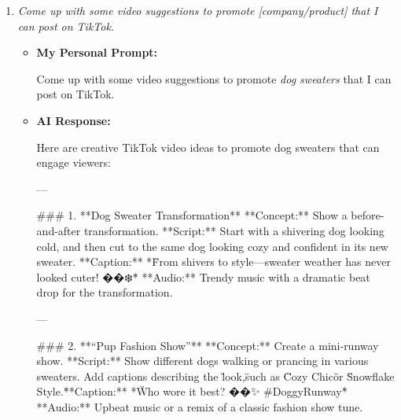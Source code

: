 \documentclass[12pt]{article}
\begin{document}
\begin{enumerate}
\begin{itemize}
---

### 9. **Holiday Cheer**
   **Caption:**  
   *"Santa’s little helper never looked so adorable! ���� Dress your pup in holiday spirit with our festive collection."*  
   **Visual:**  
   A dog in a holiday-themed sweater near decorations or a tree.

---

### 10. **Fun Facts**
   **Caption:**  
   *"Did you know? Small and short-haired dogs feel the cold more than others! Keep them comfy and safe this winter with our snug sweaters. ❄️❤️"*  
   **Visual:**  
   A short infographic or cute animated GIF.

---

Let me know if you would like a specific tone or style for any of these ideas!
        
    \end{itemize}

    \item \emph{Come up with some video suggestions to promote [company/product] that I can post on TikTok.}

    \begin{itemize}
        \item \textbf{My Personal Prompt:}

        Come up with some video suggestions to promote \emph{dog sweaters} that I can post on TikTok.

        \item \textbf{AI Response:}

Here are creative TikTok video ideas to promote dog sweaters that can engage viewers:

---

### 1. **Dog Sweater Transformation**  
   **Concept:** Show a before-and-after transformation.  
   **Script:** Start with a shivering dog looking cold, and then cut to the same dog looking cozy and confident in its new sweater.  
   **Caption:** *\"From shivers to style—sweater weather has never looked cuter! ��❄️\"*  
   **Audio:** Trendy music with a dramatic beat drop for the transformation.

---

### 2. **“Pup Fashion Show”**  
   **Concept:** Create a mini-runway show.  
   **Script:** Show different dogs walking or prancing in various sweaters. Add captions describing the \"look,\" such as \"Cozy Chic\" or \"Snowflake Style.\"  
   **Caption:** *\"Who wore it best? ��✨ #DoggyRunway\"*  
   **Audio:** Upbeat music or a remix of a classic fashion show tune.


\end{itemize}
\end{enumerate}
\end{document}
